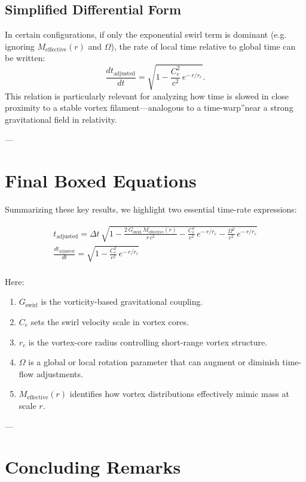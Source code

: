 \documentclass[a4paper,12pt]{article}
\begin{document}
\subsection{Simplified Differential Form}
In certain configurations, if only the exponential swirl term is dominant (e.g. ignoring \(M_\text{effective}(r)\) and \(\Omega\)), the rate of local time relative to global time can be written:
\[
    \frac{d t_\text{adjusted}}{d t}    =    \sqrt{1 - \frac{C_e^2}{c^2}\, e^{-\,r/r_c}}.
\]
This relation is particularly relevant for analyzing how time is slowed in close proximity to a stable vortex filament—analogous to a \grqq time-warp\textquotedblright near a strong gravitational field in relativity.

---

\section{Final Boxed Equations}

Summarizing these key results, we highlight two essential time-rate expressions:

\begin{gather*}
    \boxed{
        t_\text{adjusted} = \Delta t \,\sqrt{
            1 - \frac{2\,G_\text{swirl}\,M_\text{effective}(r)}{r\,c^2} - \frac{C_e^2}{c^2}\, e^{-\,r/r_c} - \frac{\Omega^2}{c^2}\, e^{-\,r/r_c}
        }
    }\\
    \boxed{
        \frac{d t_\text{adjusted}}{d t} = \sqrt{1 - \frac{C_e^2}{c^2}\, e^{-\,r/r_c}}
    }\\
\end{gather*}

Here:
\begin{enumerate}
    \item \(G_\text{swirl}\) is the vorticity-based gravitational coupling.
    \item \(C_e\) sets the swirl velocity scale in vortex cores.
    \item \(r_c\) is the vortex-core radius controlling short-range vortex structure.
    \item \(\Omega\) is a global or local rotation parameter that can augment or diminish time-flow adjustments.
    \item \(M_\text{effective}(r)\) identifies how vortex distributions effectively mimic mass at scale \(r\).
\end{enumerate}

---

\section{Concluding Remarks}
\end{document}

